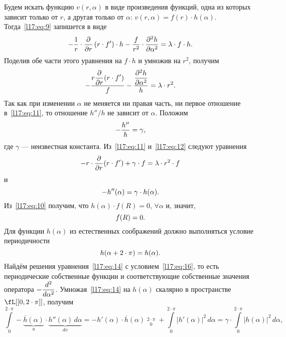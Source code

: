 Будем искать функцию $v(r,\alpha)$ в виде произведения функций, одна из которых зависит только от $r$, а другая только от $\alpha$: $v(r,\alpha)=f(r)\cdot h(\alpha)$. Тогда~\eqref{l17:eq:9} запишется в виде
\begin{equation*}
	\hfill-\frac{1}{r}\cdot\pder{}{r}\left(r\cdot f'\right)\cdot h-\frac{f}{r^2}\cdot\pdder{h}{\alpha}=\lambda\cdot f\cdot h.\hfill
\end{equation*}
Поделив обе части этого уравнения на $f\cdot h$ и умножив на $r^2$, получим
\begin{equation}\label{l17:eq:11}
	\hfill-\frac{\displaystyle r\pder{}{r}(r\cdot f')}{f}-\frac{\displaystyle\pdder{h}{\alpha}}{h}=\lambda\cdot r^2.\hfill
\end{equation}
Так как при изменении $\alpha$ не меняется ни правая часть, ни первое отношение в~\eqref{l17:eq:11}, то отношение $h''/h$ не зависит от $\alpha$. Положим
\begin{equation}\label{l17:eq:12}
	\hfill-\frac{h''}{h}=\gamma,\hfill
\end{equation}
где $\gamma$ --- неизвестная константа. Из~\eqref{l17:eq:11} и~\eqref{l17:eq:12} следуют уравнения 
\begin{equation}\label{l17:eq:13}
	\hfill-r\cdot\pder{}{r}(r\cdot f')+\gamma\cdot f=\lambda\cdot r^2\cdot f\hfill
\end{equation}
и
\begin{equation}\label{l17:eq:14}
	\hfill-h''(\alpha)=\gamma\cdot h(\alpha).\hfill
\end{equation}
Из~\eqref{l17:eq:10} получим, что $h(\alpha)\cdot f(R)=0$, $\forall\alpha$ и, значит,
\begin{equation}\label{l17:eq:15}
	\hfill f(R)=0.\hfill
\end{equation}
Для функции $h(\alpha)$ из естественных соображений должно выполняться условие периодичности 
\begin{equation}\label{l17:eq:16}
	\hfill h(\alpha+2\cdot\pi)=h(\alpha).\hfill
\end{equation}
Найдём решения уравнения~\eqref{l17:eq:14} с условием~\eqref{l17:eq:16}, то есть периодические собственные функции и соответствующие собственные значения оператора $-\displaystyle\frac{d^2}{d\alpha^2}$. Умножая~\eqref{l17:eq:14} на $h(\alpha)$ скалярно в пространстве $\fL[{[0,2\cdot\pi]}]$, получим 
\begin{equation*}
	\int\limits_0^{2\cdot\pi}-\underbrace{\overline{h}(\alpha)}_{u}\cdot \underbrace{h''(\alpha)\,d\alpha}_{dv}=-h'(\alpha)\cdot\overline{h}(\alpha)\mathop{\Big|}\limits_{0}^{2\cdot\pi}+\int\limits_{0}^{2\cdot\pi}|h'(\alpha)|^2\,d\alpha=\gamma\cdot\int\limits_{0}^{2\cdot\pi}|h(\alpha)|^2\,d\alpha,
\end{equation*}
